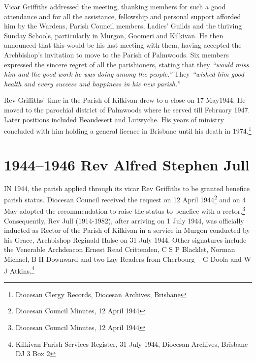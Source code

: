 Vicar Griffiths addressed the meeting, thanking members for such a good attendance and for all the assistance, fellowship and personal support afforded him by the Wardens, Parish Council members, Ladies' Guilds and the thriving Sunday Schools, particularly in Murgon, Goomeri and Kilkivan. He then announced that this would be his last meeting with them, having accepted the Archbishop's invitation to move to the Parish of Palmwoods. Six members expressed the sincere regret of all the parishioners, stating that they \emph{``would miss him and the good work he was doing among the people.''} They \emph{``wished him good health and every success and happiness in his new parish.''}



Rev Griffiths' time in the Parish of Kilkivan drew to a close on 17 May1944. He moved to the parochial district of Palmwoods where he served till February 1947. Later positions included Beaudesert and Lutwyche. His years of ministry concluded with him holding a general licence in Brisbane until his death in 1974.\footnote{Diocesan Clergy Records, Diocesan Archives, Brisbane}


\balance


\printendnotes[custom]
\setcounter{endnote}{0}
\chapter{1944--1946 Rev Alfred Stephen Jull}
\nobalance


\lettrine[lines=3]{I}{N}
 1944, the parish applied through its vicar Rev Griffiths to be granted benefice parish status. Diocesan Council received the request on 12 April 1944\footnote{Diocesan Council Minutes, 12 April 1944} and on 4 May adopted the recommendation to raise the status to benefice with a rector.\footnote{Diocesan Council Minutes, 12 April 1944} Consequently, Rev Jull (1914-1982), after arriving on 1 July 1944, was officially inducted as Rector of the Parish of Kilkivan in a service in Murgon conducted by his Grace, Archbishop Reginald Halse on 31 July 1944. Other signatures include the Venerable Archdeacon Ernest Read Crittenden, C S P Blacklet, Norman Michael, B H Downward and two Lay Readers from Cherbourg -- G Doola and W J Atkins.\footnote{Kilkivan Parish Services Register, 31 July 1944, Diocesan Archives, Brisbane DJ 3 Box 2}







